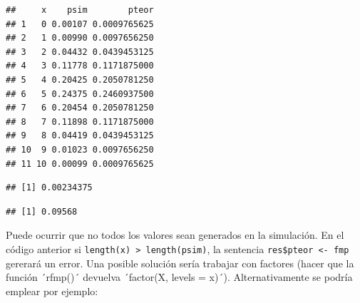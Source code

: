 \documentclass[
]{book}
\newenvironment{Shaded}{\begin{snugshade}}{\end{snugshade}}
\newcommand{\CommentTok}[1]{\textcolor[rgb]{0.56,0.35,0.01}{\textit{#1}}}
\newcommand{\KeywordTok}[1]{\textcolor[rgb]{0.13,0.29,0.53}{\textbf{#1}}}
\newcommand{\NormalTok}[1]{#1}
\newcommand{\OperatorTok}[1]{\textcolor[rgb]{0.81,0.36,0.00}{\textbf{#1}}}
\newcommand{\StringTok}[1]{\textcolor[rgb]{0.31,0.60,0.02}{#1}}
\theoremstyle{break}
\theoremstyle{definition}
\theoremstyle{definition}
\theoremstyle{definition}
\theoremstyle{remark}
\let\BeginKnitrBlock\begin \let\EndKnitrBlock\end
\begin{document}
\begin{Shaded}
\end{Shaded}

\begin{verbatim}
##     x    psim        pteor
## 1   0 0.00107 0.0009765625
## 2   1 0.00990 0.0097656250
## 3   2 0.04432 0.0439453125
## 4   3 0.11778 0.1171875000
## 5   4 0.20425 0.2050781250
## 6   5 0.24375 0.2460937500
## 7   6 0.20454 0.2050781250
## 8   7 0.11898 0.1171875000
## 9   8 0.04419 0.0439453125
## 10  9 0.01023 0.0097656250
## 11 10 0.00099 0.0009765625
\end{verbatim}

\begin{Shaded}
\end{Shaded}

\begin{verbatim}
## [1] 0.00234375
\end{verbatim}

\begin{Shaded}
\end{Shaded}

\begin{verbatim}
## [1] 0.09568
\end{verbatim}

\BeginKnitrBlock{remark}
{}Puede ocurrir que no todos los valores sean generados en la simulación.
En el código anterior si \texttt{length(x)\ \textgreater{}\ length(psim)}, la sentencia
\texttt{res\$pteor\ \textless{}-\ fmp} gererará un error.
Una posible solución sería trabajar con factores (hacer que la función ´rfmp()´ devuelva ´factor(X, levels = x)´). Alternativamente se podría emplear por ejemplo:
\EndKnitrBlock{remark}
\end{document}
